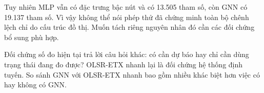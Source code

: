 Tuy nhiên MLP vẫn có đặc trưng bậc nút và có 13.505 tham số, còn GNN có 19.137 tham số. Vì vậy không thể nói phép thử đã chứng minh toàn bộ chênh lệch chỉ do cấu trúc đồ thị. Muốn tách riêng nguyên nhân đó cần các đối chứng bổ sung phù hợp.

Đối chứng số đo hiện tại trả lời câu hỏi khác: có cần dự báo hay chỉ cần dùng trạng thái đang đo được? OLSR-ETX nhanh lại là đối chứng hệ thống định tuyến. So sánh GNN với OLSR-ETX nhanh bao gồm nhiều khác biệt hơn việc có hay không có GNN.


